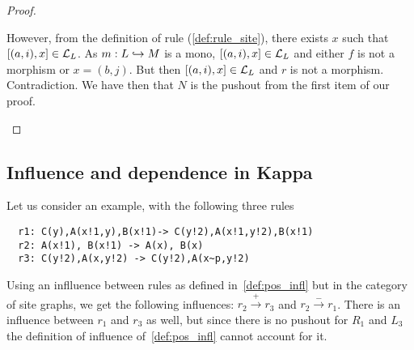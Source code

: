 \begin{proof}
\begin{enumerate}
However, from the definition of rule (\autoref{def:rule_site}), there exists $x$ such that $[(a,i),x]\in\mathcal{L}_L$. As $m:L\hookrightarrow M$ is a mono, $[(a,i),x]\in\mathcal{L}_L$ and either $f$ is not a morphism or $x=(b,j)$. But then $[(a,i),x]\in\mathcal{L}_L$ and $r$ is not a morphism. Contradiction.
%
    We have then that $N$ is the pushout from the first item of our proof.
  \end{enumerate}
\end{proof}

\subsection{Influence and dependence in Kappa}

\begin{example}
Let us consider an example, with the following three rules
\begin{verbatim}
  r1: C(y),A(x!1,y),B(x!1)-> C(y!2),A(x!1,y!2),B(x!1)
  r2: A(x!1), B(x!1) -> A(x), B(x)
  r3: C(y!2),A(x,y!2) -> C(y!2),A(x~p,y!2)
\end{verbatim}
Using an inflluence between rules as defined in~\autoref{def:pos_infl} but in the category of site graphs, we get the following influences: $r_2\xrightarrow{+} r_3$ and $r_2\xrightarrow{-} r_1$.
%
There is an influence between $r_1$ and $r_3$ as well, but since there is no pushout for $R_1$ and $L_3$ the definition of influence of~\autoref{def:pos_infl} cannot account for it.
\end{example}

